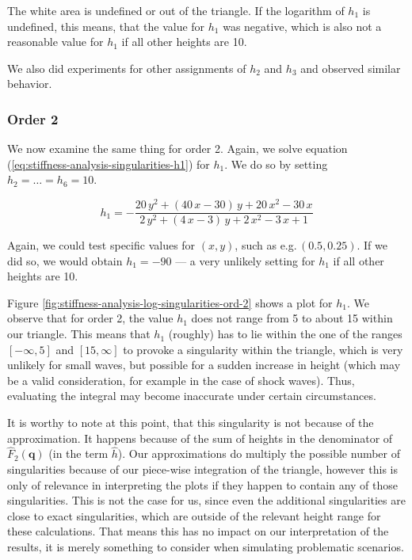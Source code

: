 \documentclass[a4paper, twoside]{article}
\begin{document}
The white area is undefined or out of the triangle. If the logarithm of $h_1$ is undefined, this means, that the value for $h_1$ was negative, which is also not a reasonable value for $h_1$ if all other heights are 10.

We also did experiments for other assignments of $h_2$ and $h_3$ and observed similar behavior.

\subsubsection{Order 2}
\label{sec:stiffness-analysis-singularities-ord-2}

We now examine the same thing for order 2. Again, we solve equation (\ref{eq:stiffness-analysis-singularities-h1}) for $h_1$. We do so by setting $h_2=\dots=h_6=10$.

\begin{equation*}
  h_1 = -\frac{20\,y^2+\left(40\,x-30\right)\,y+20\,x^2-30\,x}{2\,y^2+
    \left(4\,x-3\right)\,y+2\,x^2-3\,x+1}
\end{equation*}

Again, we could test specific values for $(x,y)$, such as e.g.\,$(0.5, 0.25)$. If we did so, we would obtain $h_1=-90$ --- a very unlikely setting for $h_1$ if all other heights are 10.

Figure \ref{fig:stiffness-analysis-log-singularities-ord-2} shows a plot for $h_1$. We observe that for order 2, the value $h_1$ does not range from 5 to about 15 within our triangle. This means that $h_1$ (roughly) has to lie within the one of the ranges $\left[ -\infty, 5 \right]$ and $\left[ 15, \infty \right]$ to provoke a singularity within the triangle, which is very unlikely for small waves, but possible for a sudden increase in height (which may be a valid consideration, for example in the case of shock waves). Thus, evaluating the integral may become inaccurate under certain circumstances.

It is worthy to note at this point, that this singularity is not because of the approximation. It happens because of the sum of heights in the denominator of $\widehat{F}_2\left(\mathbf{q}\right)$ (in the term $\widehat{h}$). Our approximations do multiply the possible number of singularities because of our piece-wise integration of the triangle, however this is only of relevance in interpreting the plots if they happen to contain any of those singularities. This is not the case for us, since even the additional singularities are close to exact singularities, which are outside of the relevant height range for these calculations. That means this has no impact on our interpretation of the results, it is merely something to consider when simulating problematic scenarios.
\end{document}
